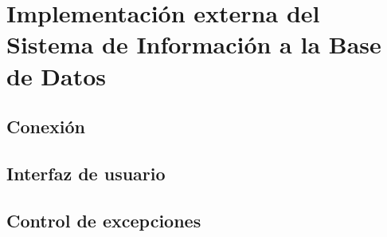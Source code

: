 \section{Implementación externa del Sistema de Información a la Base de Datos}
\subsection{Conexión}

\subsection{Interfaz de usuario}

\subsection{Control de excepciones}
